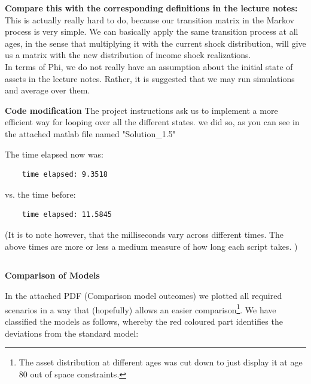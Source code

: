 \documentclass[12pt,a4paper]{article}
\begin{document}
\textbf{Compare this with the corresponding definitions in the lecture notes:} \\
This is actually really hard to do, because our transition matrix in the Markov process is very simple. We can basically apply the same transition process at all ages, in the sense that multiplying it with the current shock distribution, will give us a matrix with the new distribution of income shock realizations. \\

In terms of Phi, we do not really have an assumption about the initial state of assets in the lecture notes. Rather, it is suggested that we may run simulations and average over them.

\textbf{Code modification}
The project instructions ask us to implement a more efficient way for looping over all the different states. we did so, as you can see in the attached matlab file named "Solution\_1.5"

The time elapsed now was:

\begin{lstlisting}
    time elapsed: 9.3518
\end{lstlisting}

vs. the time before:

\begin{lstlisting}
    time elapsed: 11.5845
\end{lstlisting}

(It is to note however, that the milliseconds vary across different times. The above times are more or less a medium measure of how long each script takes. )

\subsection{}
\textbf{Comparison of Models}

In the attached PDF (Comparison model outcomes) we plotted all required scenarios in a way that (hopefully) allows an easier comparison\footnote{The asset distribution at different ages was cut down to just display it at age 80 out of space constraints.}. We have classified the models as follows, whereby the red coloured part identifies the deviations from the standard model:
\end{document}
